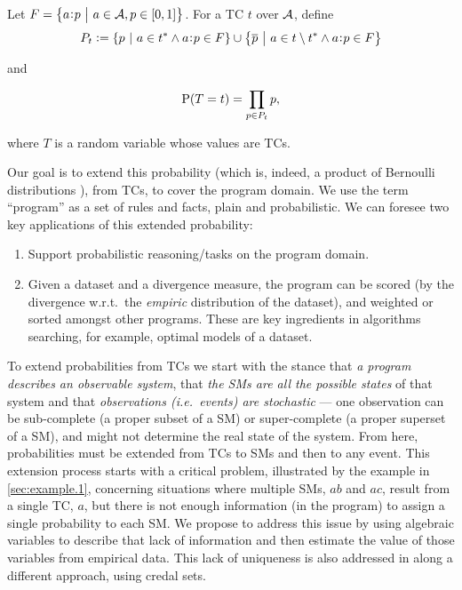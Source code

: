 \documentclass[adraft,copyright,creativecommons]{eptcs}
\newcommand{\at}[1]{\ensuremath{\!\del{#1}}}
\newcommand{\co}[1]{\ensuremath{\overline{#1}}}
\newcommand{\fml}[1]{\ensuremath{{\cal #1}}}
\newcommand{\pr}[1]{\ensuremath{\mathrm{P}\at{#1}}}
\newcommand{\given}{\ensuremath{~\middle|~}}
\newcommand{\probfact}[2]{\ensuremath{#2\mkern-4mu:\mkern-4mu#1}}
\newcounter{remark}
\newcommand{\note}[1]{
    \stepcounter{remark}%
    {\!\!\color{red}/}\footnotemark[\arabic{remark}]\!\!%
    \footnotetext[\arabic{remark}]{{\color{red}/}#1}
}
\begin{document}
Let $F = \set{\probfact{p}{a} \given a \in \fml{A}, p \in \intcc{0, 1}}$. For a \acl{TC} $t$ over $\fml{A}$, define
$$
P_t := \set{ p \given a \in t^{\ast} \wedge \probfact{p}{a} \in F} \cup 
    \set{\co{p} \given a \in t \setminus t^{\ast} \wedge \probfact{p}{a} \in F}
$$

and

\begin{equation}
    \pr{T = t} = \prod_{p \in P_t} p,
    \label{eq:prob.total.choice}
\end{equation}

where $T$ is a random variable whose values are \aclp{TC}.

Our goal is to extend this probability (which is, indeed, a product of Bernoulli distributions \cite{Teugels90}), from \aclp{TC}, to cover the program domain. We use the term ``program'' as a set of rules and facts, plain and probabilistic. We can foresee two key applications of this extended probability:

\begin{enumerate}
    \item Support probabilistic reasoning/tasks on the program domain.
    \item Given a dataset and a divergence measure, the program can be scored (by the divergence w.r.t.\ the \emph{empiric} distribution of the dataset), and weighted or sorted amongst other programs. These are key ingredients in algorithms searching, for example, optimal models of a dataset.
\end{enumerate}

To extend probabilities from \aclp{TC} we start with the stance that \emph{a program describes an observable system}, that \emph{the \aclp{SM} are all the possible states} of that system and that \emph{observations (i.e.\ events) are stochastic} --- one observation can be sub-complete (a proper subset of a \ac{SM}) or super-complete (a proper superset of a \ac{SM}),
 and might not determine the real state of the system. From here, probabilities must be extended from \acp{TC} to \acp{SM} and then to any event.
%
This extension process starts with a critical problem, illustrated by the  example in \cref{sec:example.1}, concerning situations where multiple \acp{SM}, $ab$ and $ac$, result from a single \ac{TC}, $a$, but there is not enough information (in the program) to assign a single probability to each \ac{SM}. We propose to address this issue by using algebraic variables to describe that lack of information and then estimate the value of those variables from empirical data. This lack of uniqueness is also addressed in \cite{cozman2020joy} along a different approach, using credal sets.
\end{document}

